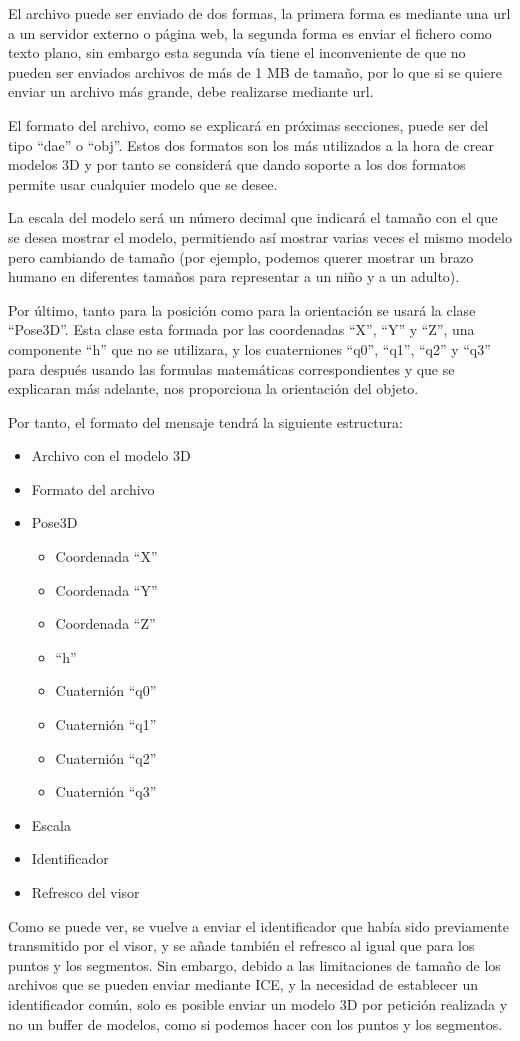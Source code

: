 El archivo puede ser enviado de dos formas, la primera forma es mediante una url a un servidor externo o página web, la segunda forma es enviar el fichero como texto plano, sin embargo esta segunda vía tiene el inconveniente de que no pueden ser enviados archivos de más de 1 MB de tamaño, por lo que si se quiere enviar un archivo más grande, debe realizarse mediante url.

El formato del archivo, como se explicará en próximas secciones, puede ser del tipo ``dae'' o ``obj''. Estos dos formatos son los más utilizados a la hora de crear modelos 3D y por tanto se considerá que dando soporte a los dos formatos permite usar cualquier modelo que se desee.

La escala del modelo será un número decimal que indicará el tamaño con el que se desea mostrar el modelo, permitiendo así mostrar varias veces el mismo modelo pero cambiando de tamaño (por ejemplo, podemos querer mostrar un brazo humano en diferentes tamaños para representar a un niño y a un adulto).

Por último, tanto para la posición como para la orientación se usará la clase ``Pose3D''. Esta clase esta formada por las coordenadas ``X'', ``Y'' y ``Z'', una componente ``h'' que no se utilizara, y los cuaterniones ``q0'', ``q1'', ``q2'' y ``q3'' para después usando las formulas matemáticas correspondientes y que se explicaran más adelante, nos proporciona la orientación del objeto.

Por tanto, el formato del mensaje tendrá la siguiente estructura:
\begin{itemize}
	\item Archivo con el modelo 3D
	\item Formato del archivo
	\item	Pose3D
	\begin{itemize}
		\item Coordenada ``X''
		\item Coordenada ``Y''
		\item Coordenada ``Z''
		\item ``h''
		\item Cuaternión ``q0''
		\item Cuaternión ``q1''
		\item Cuaternión ``q2''
		\item Cuaternión ``q3''
	\end{itemize}
	\item Escala
	\item Identificador
	\item Refresco del visor
\end{itemize}
Como se puede ver, se vuelve a enviar el identificador que había sido previamente transmitido por el visor, y se añade también el refresco al igual que para los puntos y los segmentos. Sin embargo, debido a las limitaciones de tamaño de los archivos que se pueden enviar mediante ICE, y la necesidad de establecer un identificador común, solo es posible enviar un modelo 3D por petición realizada y no un buffer de modelos, como si podemos hacer con los puntos y los segmentos.

